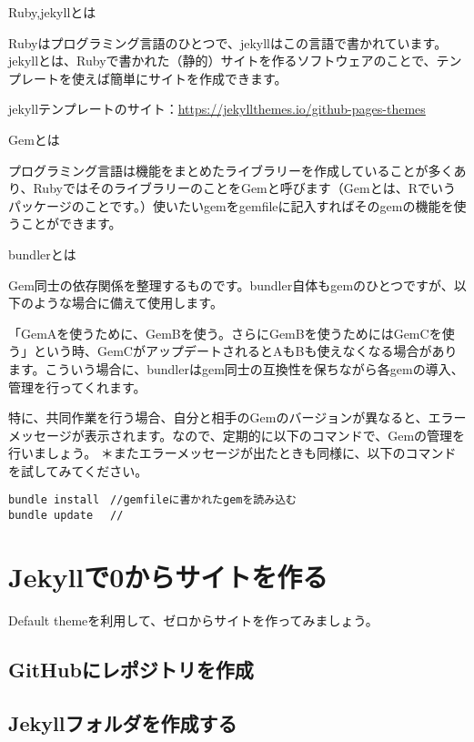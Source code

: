 \documentclass[
]{book}
\begin{document}
Ruby,jekyllとは

Rubyはプログラミング言語のひとつで、jekyllはこの言語で書かれています。jekyllとは、Rubyで書かれた（静的）サイトを作るソフトウェアのことで、テンプレートを使えば簡単にサイトを作成できます。

jekyllテンプレートのサイト：\url{https://jekyllthemes.io/github-pages-themes}

Gemとは

プログラミング言語は機能をまとめたライブラリーを作成していることが多くあり、RubyではそのライブラリーのことをGemと呼びます（Gemとは、Rでいうパッケージのことです。）使いたいgemをgemfileに記入すればそのgemの機能を使うことができます。

bundlerとは

Gem同士の依存関係を整理するものです。bundler自体もgemのひとつですが、以下のような場合に備えて使用します。

「GemAを使うために、GemBを使う。さらにGemBを使うためにはGemCを使う」という時、GemCがアップデートされるとAもBも使えなくなる場合があります。こういう場合に、bundlerはgem同士の互換性を保ちながら各gemの導入、管理を行ってくれます。

特に、共同作業を行う場合、自分と相手のGemのバージョンが異なると、エラーメッセージが表示されます。なので、定期的に以下のコマンドで、Gemの管理を行いましょう。
＊またエラーメッセージが出たときも同様に、以下のコマンドを試してみてください。

\begin{verbatim}
bundle install　//gemfileに書かれたgemを読み込む
bundle update 　//
\end{verbatim}

\hypertarget{jekyllux30670ux304bux3089ux30b5ux30a4ux30c8ux3092ux4f5cux308b}{%
\chapter{Jekyllで0からサイトを作る}\label{jekyllux30670ux304bux3089ux30b5ux30a4ux30c8ux3092ux4f5cux308b}}

Default themeを利用して、ゼロからサイトを作ってみましょう。

\hypertarget{githubux306bux30ecux30ddux30b8ux30c8ux30eaux3092ux4f5cux6210}{%
\section{GitHubにレポジトリを作成}\label{githubux306bux30ecux30ddux30b8ux30c8ux30eaux3092ux4f5cux6210}}

\hypertarget{jekyllux30d5ux30a9ux30ebux30c0ux3092ux4f5cux6210ux3059ux308b}{%
\section{Jekyllフォルダを作成する}\label{jekyllux30d5ux30a9ux30ebux30c0ux3092ux4f5cux6210ux3059ux308b}}
\end{document}
